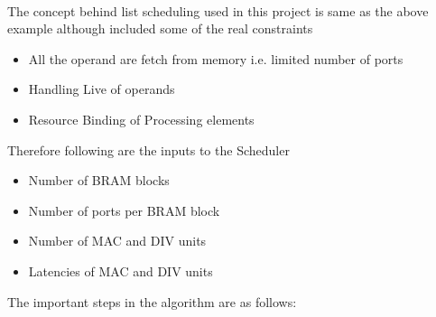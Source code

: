 \\
The concept behind list scheduling used in this project is same as the above example although included some of the real constraints
\begin{itemize}
    \item All the operand are fetch from memory i.e. limited number of ports
    \item Handling Live of operands
    \item Resource Binding of Processing elements
\end{itemize}
Therefore following are the inputs to the Scheduler
\begin{itemize}
    \item Number of BRAM blocks
    \item Number of ports per BRAM block
    \item Number of MAC and DIV units
    \item Latencies of MAC and DIV units
\end{itemize}

The important steps in the algorithm are as follows:

